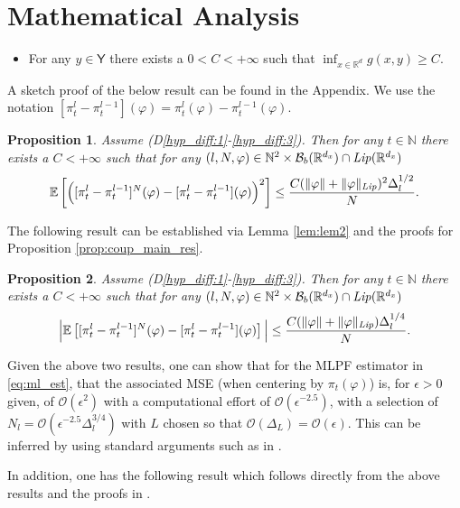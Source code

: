 \documentclass[english]{article}
\newtheorem{prop}{Proposition}[section]
\newcounter{hypD}
\newenvironment{hypD}{\refstepcounter{hypD}\begin{itemize}
 \item[({\bf D\arabic{hypD}})]}{\end{itemize}}
\begin{document}
\section{Mathematical Analysis}\label{sec:math}

\begin{hypD}\label{hyp_diff:3}
For any $y\in\mathsf{Y}$ there exists a $0<C<+\infty$ such that $\inf_{x\in\mathbb{R}^d}g(x,y)\geq C$.
\end{hypD}

A sketch proof of the below result can be found in the Appendix. We use the notation $[\pi_t^l-\pi_t^{l-1}](\varphi)=\pi_t^l(\varphi) - \pi_t^{l-1}(\varphi)$.

\begin{prop}\label{prop:coup_main_res1}
Assume (D\ref{hyp_diff:1}-\ref{hyp_diff:3}). Then for any $t\in\mathbb{N}$ there exists a $C<+\infty$ such that for
any $(l,N,\varphi)\in\mathbb{N}^2\times\mathcal{B}_b(\mathbb{R}^{d_x})\cap\textrm{\emph{Lip}}(\mathbb{R}^{d_x})$
$$
\mathbb{E}\left[\Big([\pi_t^l-\pi_t^{l-1}]^N(\varphi)-[\pi_t^l-\pi_t^{l-1}](\varphi)\Big)^2\right] \leq \frac{C(\|\varphi\|+\|\varphi\|_{\textrm{\emph{Lip}}})^2\Delta_l^{1/2}}{N}.
$$
\end{prop}

The following result can be established via Lemma \ref{lem:lem2} and the proofs for Proposition \ref{prop:coup_main_res}. 

\begin{prop}\label{prop:coup_main_res2}
Assume (D\ref{hyp_diff:1}-\ref{hyp_diff:3}). Then for any $t\in\mathbb{N}$ there exists a $C<+\infty$ such that for
any $(l,N,\varphi)\in\mathbb{N}^2\times\mathcal{B}_b(\mathbb{R}^{d_x})\cap\textrm{\emph{Lip}}(\mathbb{R}^{d_x})$
$$
\Big|\mathbb{E}\left[[\pi_t^l-\pi_t^{l-1}]^N(\varphi)-[\pi_t^l-\pi_t^{l-1}](\varphi)\right]\Big| \leq \frac{C(\|\varphi\|+\|\varphi\|_{\textrm{\emph{Lip}}})\Delta_l^{1/4}}{N}.
$$
\end{prop}

Given the above two results, one can show that for the MLPF estimator in \eqref{eq:ml_est}, that the associated MSE (when centering by $\pi_t(\varphi)$) is, for $\epsilon>0$ given, of $\mathcal{O}(\epsilon^2)$ with a computational effort of
$\mathcal{O}(\epsilon^{-2.5})$, with a selection of $N_l=\mathcal{O}(\epsilon^{-2.5}\Delta_l^{3/4})$ with $L$ chosen so that $\mathcal{O}(\Delta_L)=\mathcal{O}(\epsilon)$.
This can be inferred by using standard arguments such as in \cite{mlpf}.

In addition, one has the following result which follows directly from the above results and the proofs in \cite[Theorem 2]{ub_pf}.
\end{document}
